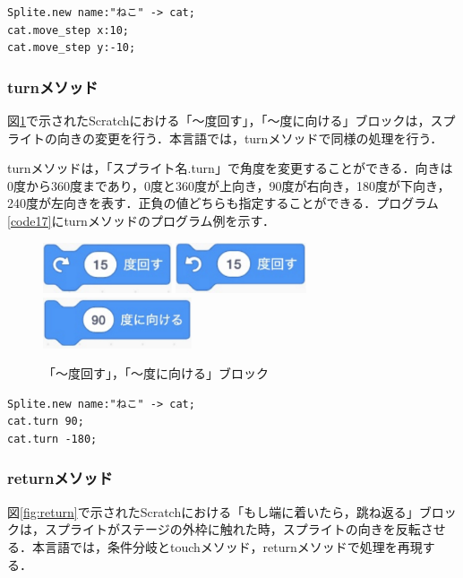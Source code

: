 \documentclass[10pt,a4j]{ltjsarticle}
\begin{document}
\begin{lstlisting}[caption=move\_stepメソッドのプログラム例, label=code16]
Splite.new name:"ねこ" -> cat;
cat.move_step x:10; 
cat.move_step y:-10; 
\end{lstlisting}

\subsubsection{turnメソッド}
図\ref{fig:turn}で示されたScratchにおける「〜度回す」，「〜度に向ける」ブロックは，スプライトの向きの変更を行う．本言語では，turnメソッドで同様の処理を行う．

turnメソッドは，「スプライト名.turn」で角度を変更することができる．向きは0度から360度まであり，0度と360度が上向き，90度が右向き，180度が下向き，240度が左向きを表す．正負の値どちらも指定することができる．プログラム\ref{code17}にturnメソッドのプログラム例を示す．

\begin{figure}[H]
  \centering
  \includegraphics[height=15mm]{images/turn_right.pdf} 
  \includegraphics[height=15mm]{images/turn_left.pdf} 
  \includegraphics[height=15mm]{images/turn.pdf}
  \caption{「〜度回す」，「〜度に向ける」ブロック}
  \label{fig:turn}
\end{figure}

\begin{lstlisting}[caption=turnメソッドのプログラム例, label=code17]
Splite.new name:"ねこ" -> cat;
cat.turn 90;
cat.turn -180; 
\end{lstlisting}

\subsubsection{returnメソッド}
図\ref{fig:return}で示されたScratchにおける「もし端に着いたら，跳ね返る」ブロックは，スプライトがステージの外枠に触れた時，スプライトの向きを反転させる．本言語では，条件分岐とtouchメソッド，returnメソッドで処理を再現する．
\end{document}
